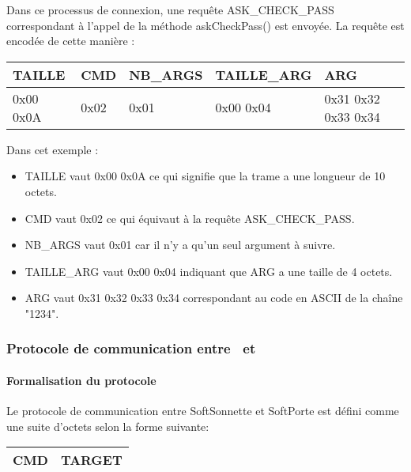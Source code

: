         Dans ce processus de connexion, une requête ASK\_CHECK\_PASS correspondant à l'appel de la méthode askCheckPass() est envoyée.
        La requête est encodée de cette manière : 

        \begin {table}[H]
        \center
        \begin{tabularx}{\textwidth}{|p{2cm}|p{2cm}|p{3cm}|p{3cm}|X|}
            \hline
            \textbf{TAILLE} & \textbf{CMD} & \textbf{NB\_ARGS} & \textbf{TAILLE\_ARG} & \textbf{ARG} \\
            \hline
            0x00 0x0A & 0x02 & 0x01 & 0x00 0x04 & 0x31 0x32 0x33 0x34\\
            \hline
        \end{tabularx}
        \end{table}

        Dans cet exemple : 

        \begin{itemize}
            \item {TAILLE vaut 0x00 0x0A ce qui signifie que la trame a une longueur de 10 octets.}
            \item {CMD vaut 0x02 ce qui équivaut à la requête ASK\_CHECK\_PASS.}
            \item {NB\_ARGS vaut 0x01 car il n'y a qu'un seul argument à suivre.}
            \item {TAILLE\_ARG vaut 0x00 0x04 indiquant que ARG a une taille de 4 octets.}
            \item {ARG vaut 0x31 0x32 0x33 0x34 correspondant au code en ASCII de la chaîne "1234".}
        \end{itemize} 

\newpage

\subsubsection{Protocole de communication entre \appliLin~et \appliPo}%

    \paragraph{Formalisation du protocole}%

    Le protocole de communication entre SoftSonnette et SoftPorte est défini comme une suite d'octets selon la forme suivante:

    \begin{center}
        \begin{tabular}{|c|c|}
            \hline
            CMD & TARGET \\
            \hline
        \end{tabular}
    \end{center}

